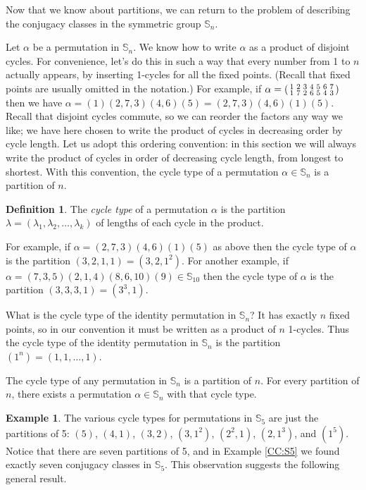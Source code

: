 \documentclass[11pt,oneside]{article}
\theoremstyle{definition}
\newtheorem{defn}[thm]{Definition}
\newtheorem{example}[thm]{Example}
\newcommand{\Sym}{\mathbb{S}}
\newenvironment{perm}[2]{\left(\begin{smallmatrix}#1 \\ #2}{\end{smallmatrix}\right)}
\begin{document}
Now that we know about partitions, we can return to the problem of
describing the conjugacy classes in the symmetric group $\Sym_n$.


Let $\alpha$ be a permutation in $\Sym_n$. We know how to write
$\alpha$ as a product of disjoint cycles. For convenience, let's do
this in such a way that every number from 1 to $n$ actually appears,
by inserting 1-cycles for all the fixed points. (Recall that fixed
points are usually omitted in the notation.) For example, if $\alpha
= \begin{perm}{1&2&3&4&5&6&7}{1&7&2&6&5&4&3} \end{perm}$ then we have
$\alpha = (1)(2,7,3)(4,6)(5) = (2,7,3)(4,6)(1)(5)$. Recall that
disjoint cycles commute, so we can reorder the factors any way we
like; we have here chosen to write the product of cycles in decreasing
order by cycle length.  Let us adopt this ordering convention: in this
section  we will always write the product of cycles in order of
decreasing cycle length, from longest to shortest. With this
convention, the cycle type of a permutation $\alpha \in \Sym_n$ is a
partition of $n$.


\begin{defn}
The \emph{cycle type} of a permutation $\alpha$ is the partition
$\lambda = (\lambda_1, \lambda_2, \dots, \lambda_k)$ of lengths of
each cycle in the product.
\end{defn}

For example, if $\alpha = (2,7,3)(4,6)(1)(5)$ as above then the cycle
type of $\alpha$ is the partition $(3,2,1,1) = (3,2,1^2)$.  For
another example, if $\alpha = (7,3,5)(2,1,4)(8,6,10)(9) \in \Sym_{10}$
then the cycle type of $\alpha$ is the partition $(3,3,3,1) =
(3^3,1)$. 

What is the cycle type of the identity permutation in $\Sym_n$? It has
exactly $n$ fixed points, so in our convention it must be written as a
product of $n$ 1-cycles. Thus the cycle type of the identity
permutation in $\Sym_n$ is the partition $(1^n) = (1,1,\dots, 1)$.


The cycle type of any permutation in $\Sym_n$ is a partition of
$n$. For every partition of $n$, there exists a permutation $\alpha
\in \Sym_n$ with that cycle type.

\begin{example}
The various cycle types for permutations in $\Sym_5$ are just the
partitions of 5: $(5)$, $(4,1)$, $(3,2)$, $(3,1^2)$, $(2^2,1)$,
$(2,1^3)$, and $(1^5)$. Notice that there are seven partitions of 5,
and in Example \ref{CC:S5} we found exactly seven conjugacy classes in
$\Sym_5$. This observation suggests the following general result.
\end{example}
\end{document}

